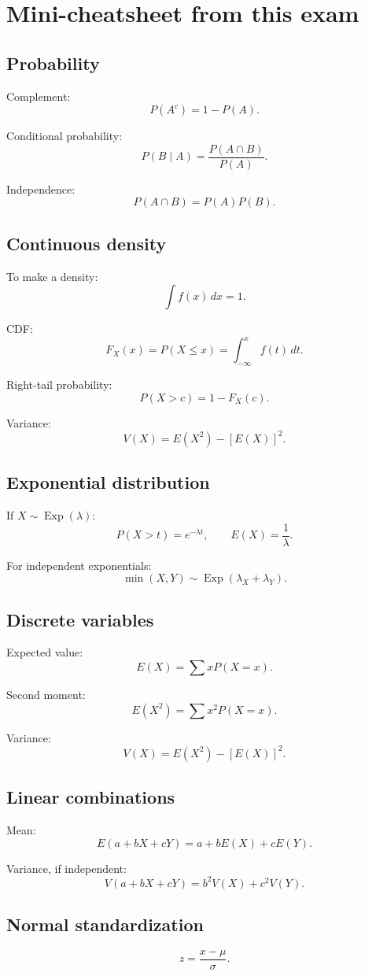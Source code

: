 \documentclass[11pt,a4paper]{article}
\begin{document}
\section*{Mini-cheatsheet from this exam}

\subsection*{Probability}
Complement:
\[
P(A^c)=1-P(A).
\]

Conditional probability:
\[
P(B\mid A)=\frac{P(A\cap B)}{P(A)}.
\]

Independence:
\[
P(A\cap B)=P(A)P(B).
\]

\subsection*{Continuous density}
To make a density:
\[
\int f(x)\,dx=1.
\]

CDF:
\[
F_X(x)=P(X\le x)=\int_{-\infty}^{x}f(t)\,dt.
\]

Right-tail probability:
\[
P(X>c)=1-F_X(c).
\]

Variance:
\[
V(X)=E(X^2)-[E(X)]^2.
\]

\subsection*{Exponential distribution}
If \(X\sim \operatorname{Exp}(\lambda)\):
\[
P(X>t)=e^{-\lambda t},
\qquad
E(X)=\frac{1}{\lambda}.
\]

For independent exponentials:
\[
\min(X,Y)\sim \operatorname{Exp}(\lambda_X+\lambda_Y).
\]

\subsection*{Discrete variables}
Expected value:
\[
E(X)=\sum xP(X=x).
\]

Second moment:
\[
E(X^2)=\sum x^2P(X=x).
\]

Variance:
\[
V(X)=E(X^2)-[E(X)]^2.
\]

\subsection*{Linear combinations}
Mean:
\[
E(a+bX+cY)=a+bE(X)+cE(Y).
\]

Variance, if independent:
\[
V(a+bX+cY)=b^2V(X)+c^2V(Y).
\]

\subsection*{Normal standardization}
\[
z=\frac{x-\mu}{\sigma}.
\]
\end{document}
